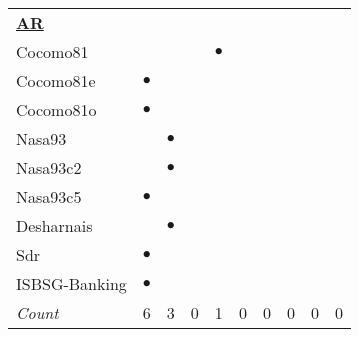 \begin{figure*}[!t]
\begin{tabular}{lccccccccc}
%
\hline\multicolumn{10}{l}{  \underline{{\bf AR}}} \\
Cocomo81	&		&		&		&	$\bullet$	&		&		&		&		&		\\
Cocomo81e	&	$\bullet$	&		&		&		&		&		&		&		&		\\
Cocomo81o	&	$\bullet$	&		&		&		&		&		&		&		&		\\
Nasa93	&		&	$\bullet$	&		&		&		&		&		&		&		\\
Nasa93c2	&		&	$\bullet$	&		&		&		&		&		&		&		\\
Nasa93c5	&	$\bullet$	&		&		&		&		&		&		&		&		\\
Desharnais	&		&	$\bullet$	&		&		&		&		&		&		&		\\
Sdr	&	$\bullet$	&		&		&		&		&		&		&		&		\\
ISBSG-Banking	&	$\bullet$	&		&		&		&		&		&		&		&		\\
\rowcolor{DarkGray}\em Count	&	6	&	3	&	0	&	1	&	0	&	0	&	0	&	0	&	0	\\

	\hline
\end{tabular}


\end{figure*}
